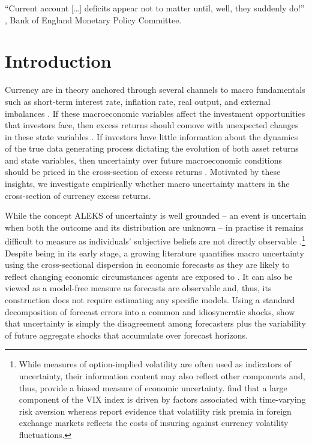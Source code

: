 \begin{flushright}
\textquotedblleft Current account [\ldots] deficits appear not to matter until, well, they suddenly do!\textquotedblright \\
\citet{sw:1999}, Bank of England Monetary Policy Committee. \\
\end{flushright}

\section{Introduction} \label{sec:introduction_UNC_CAR}
Currency are in theory anchored through several channels to macro fundamentals such as short-term interest rate, inflation rate, real output, and external imbalances \citep[e.g.,][]{engel_west2005,gabaix_maggiori2015,lustig_etal2011}. If these macroeconomic variables affect the investment opportunities that investors face, then excess returns should comove with unexpected changes in these state variables \citep{merton1973}. If investors have little information about the dynamics of the true data generating process dictating the evolution of both asset returns and state variables, then uncertainty over future macroeconomic conditions should be priced in the cross-section of excess returns \citep[e.g.,][]{anderson_etal2009,Bali:2014}. Motivated by these insights, we investigate empirically whether macro uncertainty matters in the cross-section of currency excess returns.


While the concept ALEKS of uncertainty is well grounded -- an event is uncertain when both the outcome and its distribution are unknown -- in practise it remains difficult to measure as individuals' subjective beliefs are not directly observable \citep[e.g.,][]{Bloom:2014}.\footnote{While measures of option-implied volatility are often used as indicators of uncertainty, their information content may also reflect other components and, thus, provide a biased measure of economic uncertainty. \citet{Bekaert/Hoerova/LoDuca:2013} find that a large component of the VIX index is driven by factors associated with time-varying risk aversion whereas \citet{dellacorte_etal2014} report evidence that volatility risk premia in foreign exchange markets reflects the costs of insuring against currency volatility fluctuations.} Despite being in its early stage, a growing literature quantifies macro uncertainty using the cross-sectional dispersion in economic forecasts as they are likely to reflect changing economic circumstances agents are exposed to \citep[e.g.,][]{beber_etal2010,Bloom2009,Bomberger:1996,Zarnowitz/Lambros:1987}. It can also be viewed as a model-free measure as forecasts are observable and, thus, its construction does not require estimating any specific models. Using a standard decomposition of forecast errors into a common and idiosyncratic shocks, \citet{lahiri_sheng2010} show that uncertainty is simply the disagreement among forecasters plus the variability of future aggregate shocks that accumulate over forecast horizons.

